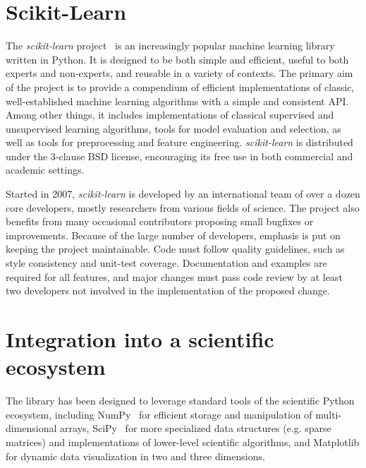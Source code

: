 \documentclass{article}
\newcommand{\sklearn}{\textit{scikit-learn}\xspace}
\begin{document}

\section*{Scikit-Learn}

The \sklearn project~\citep{pedregosa2011} is an increasingly popular machine
learning library written in Python.  It is designed to be both  simple and
efficient, useful to both experts and non-experts, and reusable in a variety of
contexts. The  primary aim of the project is to provide a compendium of
efficient implementations of classic, well-established  machine learning
algorithms with a simple and consistent API. Among other things, it includes
implementations of classical supervised and unsupervised learning algorithms,
tools for model evaluation and selection, as  well as tools for preprocessing
and feature engineering. \sklearn is distributed under the 3-clause  BSD
license, encouraging its free use in both commercial and academic settings.

Started in 2007, \sklearn is developed by an international team of over a dozen
core developers, mostly researchers from various fields of science. The project
also benefits from many occasional contributors proposing small bugfixes or
improvements. Because of the large number of developers, emphasis is put on
keeping the project maintainable. Code must follow quality guidelines, such as
style consistency and unit-test coverage. Documentation and examples are
required for all features, and major changes must pass code review by at least
two developers not involved in the implementation of the proposed change.


\section*{Integration into a scientific ecosystem}

The library has been designed to leverage standard tools of the scientific
Python ecosystem, including NumPy~\citep{vanderwalt2011} for efficient  storage
and manipulation of multi-dimensional arrays, SciPy~\citep{varoquaux2013scipy}
for more specialized data structures  (e.g. sparse matrices) and
implementations of lower-level scientific algorithms, and Matplotlib for
dynamic data visualization in two and three dimensions.
\end{document}
